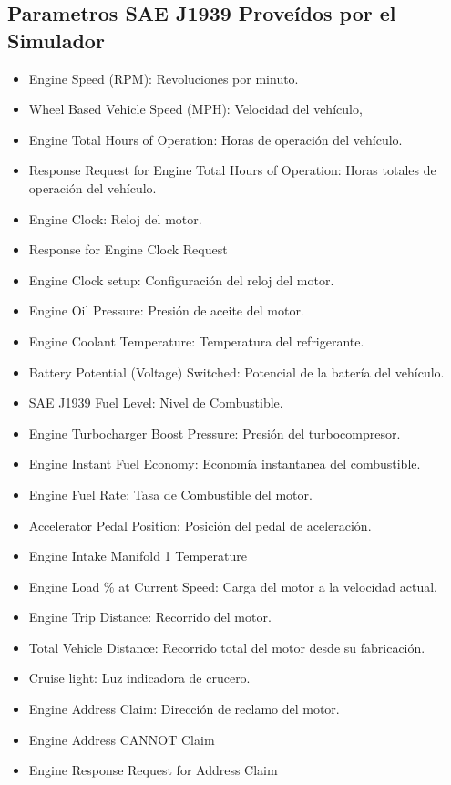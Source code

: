 \subsection{Parametros SAE J1939 Proveídos por el Simulador}

\begin{itemize}
\item Engine Speed (RPM): Revoluciones por minuto.
\item Wheel Based Vehicle Speed (MPH): Velocidad del vehículo, 
\item Engine Total Hours of Operation: Horas de operación del vehículo.
\item Response Request for Engine Total Hours of Operation: Horas totales de operación del vehículo.
\item Engine Clock: Reloj del motor.
\item Response for Engine Clock Request
\item Engine Clock setup: Configuración del reloj del motor.
\item Engine Oil Pressure: Presión de aceite del motor.
\item Engine Coolant Temperature: Temperatura del refrigerante.
\item Battery Potential (Voltage) Switched: Potencial de la batería del vehículo.
\item SAE J1939 Fuel Level: Nivel de Combustible. 
\item Engine Turbocharger Boost Pressure: Presión del turbocompresor.
\item Engine Instant Fuel Economy: Economía instantanea del combustible. 
\item Engine Fuel Rate: Tasa de Combustible del motor.
\item Accelerator Pedal Position: Posición del pedal de aceleración.
\item Engine Intake Manifold 1 Temperature
\item Engine Load \% at Current Speed: Carga del motor a la velocidad actual.
\item Engine Trip Distance: Recorrido del motor.
\item Total Vehicle Distance: Recorrido total del motor desde su fabricación.
\item Cruise light: Luz indicadora de crucero.
\item Engine Address Claim: Dirección de reclamo del motor.
\item Engine Address CANNOT Claim
\item Engine Response Request for Address Claim

\end{itemize}
